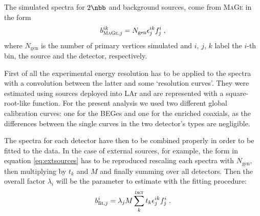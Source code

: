  The simulated spectra for $2\nbb$ and background sources, come from \textsc{MaGe} in the form
\begin{equation}b^{ik}_{\textsc{MaGe},j}=N_\text{gen}\epsilon^{ik}_jf_j^i\;,\end{equation}
where $N_\text{gen}$ is the number of primary vertices simulated and $i$, $j$, $k$ label the $i$-th bin, the source and the detector, respectively.

First of all the experimental energy resolution has to be applied to the spectra with a convolution between the latter and some `resolution curves'. They were estimated using  sources deployed into LAr and are represented with a square-root-like function. For the present analysis we used two different global calibration curves: one for the BEGes and one for the enriched coaxials, as the differences between the single curves in the two detector's types are negligible.

The spectra for each detector have then to be combined properly in order to be fitted to the data. In the case of external sources, for example, the form in equation \ref{eq:extsources} has to be reproduced rescaling each spectra with $N_\text{gen}$, then multiplying by $t_k$ and $M$ and finally summing over all detectors. Then the overall factor $\lambda_i$ will be the parameter to estimate with the fitting procedure:
\begin{equation}b_{\text{fit},j}^i=\lambda_jM\sum_k^\textsc{det}t_k\epsilon_j^{ik}f_j^i\;.\end{equation}

